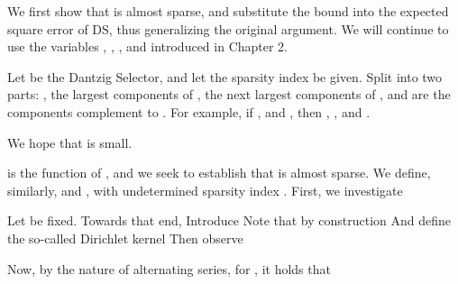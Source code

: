 \startsection [title={Almost-Sparsity of Angular Channel Response}]
\startsubsection [title={Norm of Array Response}]

We first show that  is almost sparse, and substitute the bound into the expected square error of DS, thus generalizing the original argument.
We will continue to use the variables , , , and  introduced in Chapter 2.

Let  be the Dantzig Selector, and let the sparsity index  be given.
Split  into two parts: , the largest  components of ,  the next  largest components of , and  are the components complement to .
For example, if , and , then , , and .

We hope that  is small.

 is the function of , and we seek to establish that  is almost sparse.
We define, similarly,  and , with undetermined sparsity index .
First, we investigate

Let \m {\f} be fixed.
Towards that end, 
Introduce
Note that by construction
And define the so-called Dirichlet kernel
Then observe

Now, by the nature of alternating series, for , it holds that

